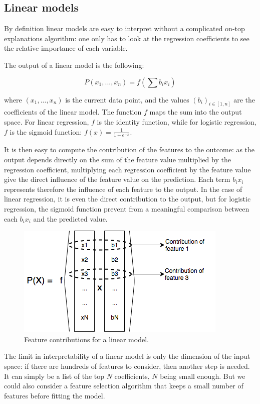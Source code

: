 \documentclass[a4paper,11pt]{kth-mag}
\begin{document}
\subsection{Linear models}

By definition linear models are easy to interpret without a complicated on-top explanations algorithm: one only has to look at the regression coefficients to see the relative importance of each variable.

The output of a linear model is the following:

\[
	P(x_1, ..., x_n) = f \left( \sum b_i x_i \right)
\]

where $(x_1, ..., x_n)$ is the current data point, and the values $(b_i)_{i \in [1, n]}$ are the coefficients of the linear model. The function $f$ maps the sum into the output space. For linear regression, $f$ is the identity function, while for logistic regression, $f$ is the sigmoid function: $f(x) = \frac1{1 + e^{-x}}$.

It is then easy to compute the contribution of the features to the outcome: as the output depends directly on the sum of the feature value multiplied by the regression coefficient, multiplying each regression coefficient by the feature value give the direct influence of the feature value on the prediction. Each term $b_i x_i$ represents therefore the influence of each feature to the output. In the case of linear regression, it is even the direct contribution to the output, but for logistic regression, the sigmoid function prevent from a meaningful comparison between each $b_i x_i$ and the predicted value.

\begin{figure}[!h]
	\centering
   	\def\svgwidth{\columnwidth}
	\includegraphics[scale=0.5]{linear_explanation.png}
    \caption{Feature contributions for a linear model.}
\end{figure}


The limit in interpretability of a linear model is only the dimension of the input space: if there are hundreds of features to consider, then another step is needed. It can simply be a list of the top $N$ coefficients, $N$ being small enough. But we could also consider a feature selection algorithm that keeps a small number of features before fitting the model.
\end{document}
